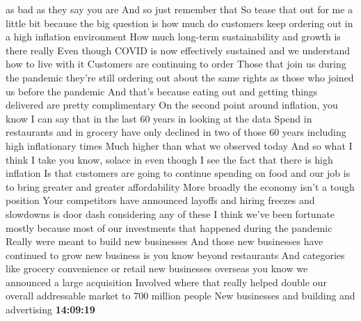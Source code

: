 \documentclass{article}%
\begin{document}
as bad as they say you are And so just remember that So tease that out for me a little bit because the big question is how much do customers keep ordering out in a high inflation environment How much long{-}term sustainability and growth is there really Even though COVID is now effectively sustained and we understand how to live with it Customers are continuing to order Those that join us during the pandemic they're still ordering out about the same rights as those who joined us before the pandemic And that's because eating out and getting things delivered are pretty complimentary On the second point around inflation, you know I can say that in the last 60 years in looking at the data Spend in restaurants and in grocery have only declined in two of those 60 years including high inflationary times Much higher than what we observed today And so what I think I take you know, solace in even though I see the fact that there is high inflation Is that customers are going to continue spending on food and our job is to bring greater and greater affordability More broadly the economy isn't a tough position Your competitors have announced layoffs and hiring freezes and slowdowns is door dash considering any of these I think we've been fortunate mostly because most of our investments that happened during the pandemic Really were meant to build new businesses And those new businesses have continued to grow new business is you know beyond restaurants And categories like grocery convenience or retail new businesses overseas you know we announced a large acquisition Involved where that really helped double our overall addressable market to 700 million people New businesses and building and advertising%
\textbf{14:09:19}%
\newline%
\end{document}
